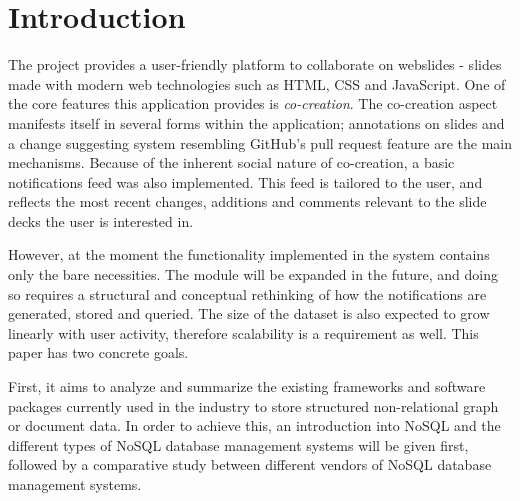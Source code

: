 \documentclass[fleqn,10pt]{voorstel}
\affiliation{\textbf{Contact:} \href{mailto:florian@floriandejonckheere.be}{florian@floriandejonckheere.be}}
\begin{document}
\flushbottom %
\maketitle %
\tableofcontents %
\thispagestyle{empty} %



\section{Introduction} %
\label{sec:introduction}


The \textcite{OpenWebslides} project provides a user-friendly platform to collaborate on webslides - slides made with modern web technologies such as HTML, CSS and JavaScript. One of the core features this application provides is \emph{co-creation}. The co-creation aspect manifests itself in several forms within the application; annotations on slides and a change suggesting system resembling GitHub's pull request feature are the main mechanisms. Because of the inherent social nature of co-creation, a basic notifications feed was also implemented. This feed is tailored to the user, and reflects the most recent changes, additions and comments relevant to the slide decks the user is interested in.

However, at the moment the functionality implemented in the system contains only the bare necessities. The module will be expanded in the future, and doing so requires a structural and conceptual rethinking of how the notifications are generated, stored and queried. The size of the dataset is also expected to grow linearly with user activity, therefore scalability is a requirement as well.
This paper has two concrete goals.

First, it aims to analyze and summarize the existing frameworks and software packages currently used in the industry to store structured non-relational graph or document data. In order to achieve this, an introduction into NoSQL and the different types of NoSQL database management systems will be given first, followed by a comparative study between different vendors of NoSQL database management systems.
\end{document}
